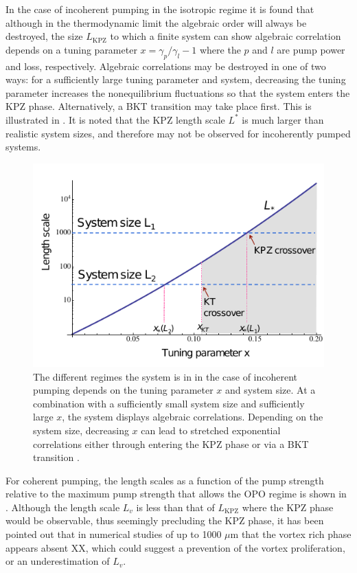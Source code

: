 In the case of incoherent pumping in the isotropic regime it is found \cite{2015PhRvX...5a1017A} that although in the thermodynamic limit the algebraic order will always be destroyed, the size $L_{\text{KPZ}}$ to which a finite system can show algebraic correlation depends on a tuning parameter $x = \gamma_p/\gamma_l - 1$ where the $p$ and $l$ are pump power and loss, respectively. Algebraic correlations may be destroyed in one of two ways: for a sufficiently large tuning parameter and system, decreasing the tuning parameter increases the nonequilibrium fluctuations so that the system enters the KPZ phase. Alternatively, a BKT transition may take place first. This is illustrated in \fig{\ref{fig:incoherentkpz}}.
It is noted that the KPZ length scale $L^*$ is much larger than realistic system sizes, and therefore may not be observed for incoherently pumped systems. 

\begin{figure}[htbp!]
	\centering
	\includegraphics[scale=0.7]{incoherentkpz.pdf}
	\caption{The different regimes the system is in in the case of incoherent pumping depends on the tuning parameter $x$ and system size. At a combination with a sufficiently small system size and sufficiently large $x$, the system displays algebraic correlations. Depending on the system size, decreasing $x$ can lead to stretched exponential correlations either through entering the KPZ phase or via a BKT transition \cite{2015PhRvX...5a1017A}.}
	\label{fig:incoherentkpz}
\end{figure}

For coherent pumping, the length scales as a function of the pump strength relative to the maximum pump strength that allows the OPO regime is shown in \fig{\ref{fig:coherentwa}}. Although the length scale $L_v$ is less than that of $L_{\text{KPZ}}$ where the KPZ phase would be observable, thus seemingly precluding the KPZ phase, it has been pointed out that in numerical studies of up to 1000 $\mu$m that the vortex rich phase appears absent XX, which could suggest a prevention of the vortex proliferation, or an underestimation of $L_v$.

